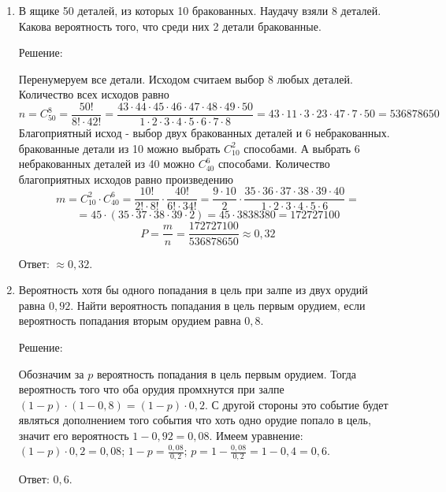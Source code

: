 \documentclass{article}
\begin{document}
\begin{enumerate}

\item %
В ящике 50 деталей, из которых 10 бракованных. Наудачу взяли 8 деталей. Какова вероятность того, что среди них 2 детали бракованные.
\begin{center}Решение:\end{center}
Перенумеруем все детали. Исходом считаем выбор 8 любых деталей.
Количество всех исходов равно
$$n=C_{50}^{8}=\frac{50!}{8!\cdot42!}=\frac{43\cdot44\cdot45\cdot46\cdot47\cdot48\cdot49\cdot50}{1\cdot2\cdot3\cdot4\cdot5\cdot6\cdot7\cdot8}=43\cdot11\cdot3\cdot23\cdot47\cdot7\cdot50=536878650$$
Благоприятный исход - выбор двух бракованных деталей и 6 небракованных.  бракованные детали из 10 можно выбрать $C_{10}^{2}$ способами. А выбрать 6 небракованных деталей из 40 можно $C_{40}^{6}$ способами. \newline
Количество благоприятных исходов равно произведению
$$m=C_{10}^{2}\cdot C_{40}^{6}=\frac{10!}{2!\cdot8!}\cdot\frac{40!}{6!\cdot34!}=\frac{9\cdot10}{2}\cdot\frac{35\cdot36\cdot37\cdot38\cdot39\cdot40}{1\cdot2\cdot3\cdot4\cdot5\cdot6}=$$
$$=45\cdot(35\cdot37\cdot38\cdot39\cdot2)=45\cdot3838380=172727100$$
$$P=\frac{m}{n}=\frac{172727100}{536878650}\approx0,32$$

Ответ: $\approx0,32$.

\item %
Вероятность хотя бы одного попадания в цель при залпе из двух орудий равна $0,92$. Найти вероятность попадания в цель первым орудием, если вероятность попадания вторым орудием равна $0,8$.
\begin{center}Решение:\end{center}
Обозначим за $p$ вероятность попадания в цель первым орудием. Тогда вероятность того что оба орудия промхнутся при залпе $(1-p)\cdot(1-0,8)=(1-p)\cdot0,2$. С другой стороны это событие будет являться дополнением того события что хоть одно орудие попало в цель, значит его вероятность $1-0,92=0,08$. \newline Имеем уравнение:
$(1-p)\cdot0,2=0,08$;
$1-p=\frac{0,08}{0,2}$;
$p=1-\frac{0,08}{0,2}=1-0,4=0,6$.

Ответ: $0,6$.


\end{enumerate}
\end{document}
